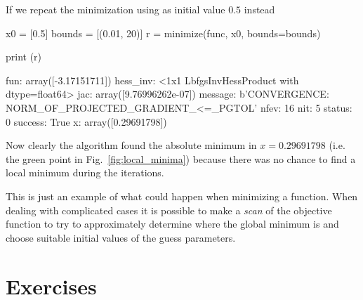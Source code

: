If we repeat the minimization using as initial value $0.5$ instead
\begin{ipythonnon}
x0 = [0.5]
bounds = [(0.01, 20)]
r = minimize(func, x0, bounds=bounds)

print (r)
\end{ipythonnon}
\begin{ioutput}
     fun: array([-3.17151711])
hess_inv: <1x1 LbfgsInvHessProduct with dtype=float64>
     jac: array([9.76996262e-07])
 message: b'CONVERGENCE: NORM_OF_PROJECTED_GRADIENT_<=_PGTOL'
    nfev: 16
     nit: 5
  status: 0
 success: True
       x: array([0.29691798])
\end{ioutput}
Now clearly the algorithm found the absolute minimum in $x=0.29691798$ (i.e. the green point in Fig.~\ref{fig:local_minima}) because there was no chance to 
find a local minimum during the iterations.

This is just an example of what could happen when minimizing a function. When dealing with complicated cases it is possible to make a \emph{scan} of the objective 
function to try to approximately determine where the global minimum is and choose suitable initial values of the guess parameters.

\section*{Exercises}
%

